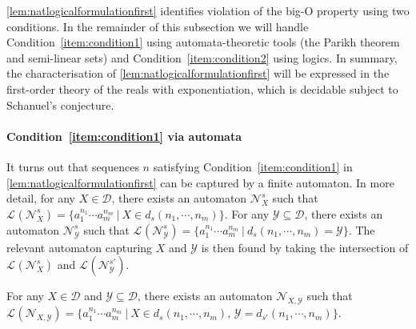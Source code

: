 \documentclass[10pt,a4paper]{amsart}
\numberwithin{equation}{section}
\theoremstyle{plain}
\theoremstyle{definition}
\theoremstyle{remark}
\newcommand\lng[2]{\mathcal{L}_{#1}(#2)}
\newcommand\dgf{d}
\newcommand\adm{\mathcal{D}}
\begin{document}
\cref{lem:natlogicalformulationfirst} identifies violation of the big-O property using two conditions. In the remainder of this subsection we will handle  Condition~\ref{item:condition1} using automata-theoretic tools (the Parikh theorem and semi-linear sets) and Condition~\ref{item:condition2} using logics. In summary, the characterisation of \cref{lem:natlogicalformulationfirst} will be expressed in the first-order theory of the reals with exponentiation, which is decidable subject to Schanuel's conjecture.

\paragraph*{Condition~\ref{item:condition1} via automata}

It turns out that sequences $n$ satisfying Condition~\ref{item:condition1} in \cref{lem:natlogicalformulationfirst} can be captured by a finite automaton.  In more detail, for any  $X\in \mathcal{D}$, there exists an automaton $\mathcal{N}^s_{X}$ such that
$\lng{}{\mathcal{N}^s_{X}} = \{ a_1^{n_1}\cdots a_m^{n_m} \ | \ X\in \dgf_s(n_1,\cdots,n_m) \}$. For any $\mathcal{Y}\subseteq \mathcal{D}$, there exists an automaton $\mathcal{N}^s_{\mathcal{Y}}$ such that
$\lng{}{\mathcal{N}^s_{\mathcal{Y}}} = \{ a_1^{n_1}\cdots a_m^{n_m} \ | \ \dgf_s(n_1,\cdots,n_m) = \mathcal{Y} \}$. The relevant automaton capturing $X$ and $\mathcal{Y}$ is then found by taking  the intersection of $\lng{}{\mathcal{N}^s_{{X}}}$ and $\lng{}{\mathcal{N}^{s'}_{\mathcal{Y}}}$.
\begin{lem} \label{lem:detectors}
For any $X\in\adm$ and $\mathcal{Y}\subseteq\adm$, there exists an automaton $\mathcal{N}_{X,\mathcal{Y}}$ such that
$\lng{}{\mathcal{N}_{X,\mathcal{Y}}} = \{ a_1^{n_1}\cdots a_m^{n_m}\ |\  X\in \dgf_s(n_1,\cdots,n_m),\, \mathcal{Y} = \dgf_{s'}(n_1,\cdots, n_m) \}$.
\end{lem}
\end{document}

